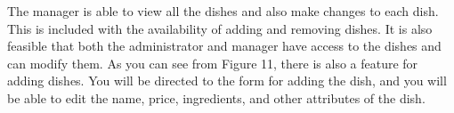 The manager is able to view all the dishes and also make changes to each dish. This is included with the availability of adding and removing dishes. It is also feasible that both the administrator and manager have access to the dishes and can modify them. As you can see from Figure 11, there is also a feature for adding dishes. You will be directed to the form for adding the dish, and you will be able to edit the name, price, ingredients, and other attributes of the dish.